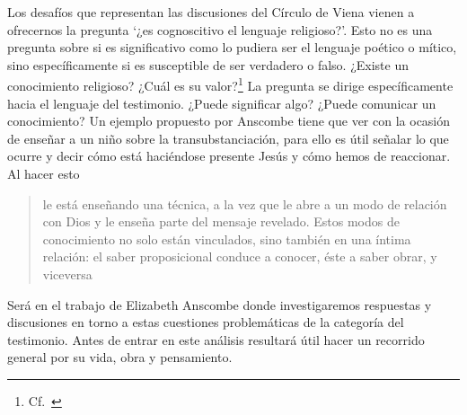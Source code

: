 Los desafíos que representan las discusiones del Círculo de Viena vienen a ofrecernos la pregunta \enquote*{¿es cognoscitivo el lenguaje religioso?}. Esto no es una pregunta sobre si es significativo como lo pudiera ser el lenguaje poético o mítico, sino específicamente si es susceptible de ser verdadero o falso. ¿Existe un conocimiento religioso? ¿Cuál es su valor?\footnote{Cf.~\cite[23]{conesa1994cc}} La pregunta se dirige específicamente hacia el lenguaje del testimonio. ¿Puede significar algo? ¿Puede comunicar un conocimiento? Un ejemplo propuesto por Anscombe tiene que ver con la ocasión de enseñar a un niño sobre la transubstanciación, para ello es útil señalar lo que ocurre y decir cómo está haciéndose presente Jesús y cómo hemos de reaccionar. Al hacer esto \blockquote[{\cite[21]{conesa1994cc}}]{le está enseñando una técnica, a la vez que le abre a un modo de relación con Dios y le enseña parte del mensaje revelado. Estos modos de conocimiento no solo están vinculados, sino también en una íntima relación: el saber proposicional conduce a conocer, éste a saber obrar, y viceversa}.

Será en el trabajo de Elizabeth Anscombe donde investigaremos respuestas y discusiones en torno a estas cuestiones problemáticas de la categoría del testimonio. Antes de entrar en este análisis resultará útil hacer un recorrido general por su vida, obra y pensamiento.
